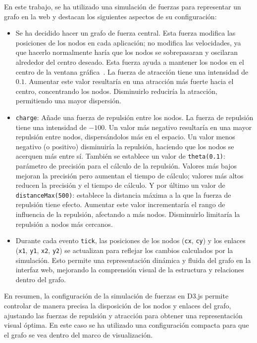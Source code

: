 En este trabajo, se ha utilizado una simulación de fuerzas para representar un grafo en la web y destacan los siguientes aspectos de su configuración:

\begin{itemize}
	\item Se ha decidido hacer un grafo de fuerza central. Esta fuerza modifica las posiciones de los nodos en cada aplicación; no modifica las velocidades, ya que hacerlo normalmente haría que los nodos se sobrepasaran y oscilaran alrededor del centro deseado. Esta fuerza ayuda a mantener los nodos en el centro de la ventana gráfica~\cite{fuerzaCentral}. La fuerza de atracción tiene una intensidad de $0.1$. Aumentar este valor resultaría en una atracción más fuerte hacia el centro, concentrando los nodos. Disminuirlo reduciría la atracción, permitiendo una mayor dispersión.
	\item \texttt{charge}: Añade una fuerza de repulsión entre los nodos. La fuerza de repulsión tiene una intensidad de $-100$. Un valor más negativo resultaría en una mayor repulsión entre nodos, dispersándolos más en el espacio. Un valor menos negativo (o positivo) disminuiría la repulsión, haciendo que los nodos se acerquen más entre sí. También se establece un valor de \texttt{theta(0.1)}: parámetro de precisión para el cálculo de la repulsión. Valores más bajos mejoran la precisión pero aumentan el tiempo de cálculo; valores más altos reducen la precisión y el tiempo de cálculo. Y por último un valor de \texttt{distanceMax(500)}: establece la distancia máxima a la que la fuerza de repulsión tiene efecto. Aumentar este valor incrementaría el rango de influencia de la repulsión, afectando a más nodos. Disminuirlo limitaría la repulsión a nodos más cercanos.
	\item Durante cada evento \texttt{tick}, las posiciones de los nodos (\texttt{cx}, \texttt{cy}) y los enlaces (\texttt{x1}, \texttt{y1}, \texttt{x2}, \texttt{y2}) se actualizan para reflejar los cambios calculados por la simulación. Esto permite una representación dinámica y fluida del grafo en la interfaz web, mejorando la comprensión visual de la estructura y relaciones dentro del grafo.
	
\end{itemize}

En resumen, la configuración de la simulación de fuerzas en D3.js permite controlar de manera precisa la disposición de los nodos y enlaces del grafo, ajustando las fuerzas de repulsión y atracción para obtener una representación visual óptima. En este caso se ha utilizado una configuración compacta para que el grafo se vea dentro del marco de visualización.

